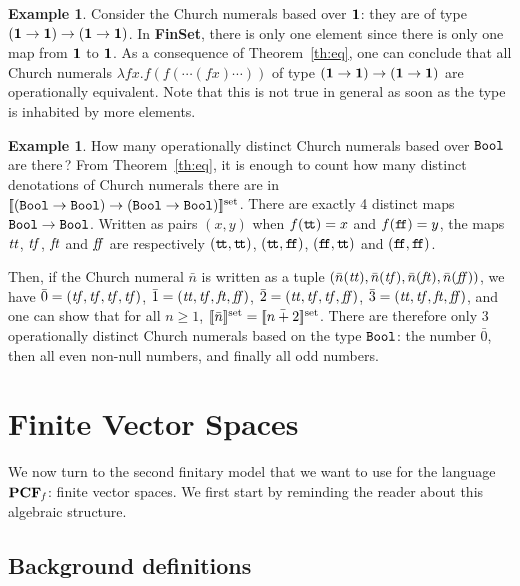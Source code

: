 \documentclass[10pt]{article}
\theoremstyle{plain}
\theoremstyle{definition}
\newtheorem{example}[theorem]{Example}
\newcommand{\FinSet}{\mbox{\bf FinSet}}
\newcommand{\tunit}{{\bf 1}}
\newcommand{\ttrue}{{\tt t}\!{\tt t}}
\newcommand{\ffalse}{{\tt f}\!{\tt f}}
\newcommand{\bit}{{\tt Bool}}
\newcommand{\fsdenot}[1]{{[\![{#1}]\!]^{\rm set}}}
\begin{document}
\begin{example}\label{ex:numunit}
  Consider the Church numerals based over $\tunit$: they are
  of type
  $(\tunit\to\tunit)\to(\tunit\to\tunit)$. 
  In {\FinSet}, there is only one element since there is only one
  map from $\tunit$ to $\tunit$. 
  As a consequence of
  Theorem~\ref{th:eq}, one can conclude that all Church numerals
  $
  \lambda fx.f(f(\cdots (fx)\cdots))$ of type $(\tunit\to\tunit)\to(\tunit\to\tunit)$
  are operationally equivalent. Note that this is not true
  in general as soon as the type is inhabited by more elements.
\end{example}

\begin{example}\label{ex:numbool}
  How many operationally distinct Church numerals based over $\bit$
  are there\,?  From Theorem~\ref{th:eq}, it is enough to count how
  many distinct denotations of Church numerals there are in
  $\fsdenot{(\bit\to\bit)\to(\bit\to\bit)}$. There
  are exactly 4 distinct maps $\bit\to\bit$. Written as pairs $(x,y)$
  when $f(\ttrue)=x$ and $f(\ffalse)=y$, the maps ${\it tt}$, ${\it
    tf}$, ${\it ft}$ and  ${\it ff}$ are respectively
  $(\ttrue,\ttrue)$,
  $(\ttrue,\ffalse)$,
  $(\ffalse,\ttrue)$ and
  $(\ffalse,\ffalse)$.

  Then, if the Church numeral $\bar{n}$ is written as a tuple
  $(\bar{n}({\it tt}),\bar{n}({\it tf}),\bar{n}({\it ft}),\bar{n}({\it
    ff}))$, we have
    $\bar{0} = ({\it tf},{\it tf},{\it tf},{\it tf})$,
    $\bar{1} {}= ({\it tt},{\it tf},{\it ft},{\it ff})$,
    $\bar{2} {}= ({\it tt},{\it tf},{\it tf},{\it ff})$,
    $\bar{3} {}= ({\it tt},{\it tf},{\it ft},{\it ff})$,
  and one can show that for all $n\geq 1$, $\fsdenot{\bar{n}} =
  \fsdenot{\bar{n+2}}$. There are therefore only 3 operationally
  distinct Church numerals based on the type $\bit$: the number
  $\bar{0}$, then all even non-null numbers, and finally all odd
  numbers.
\end{example}




\section{Finite Vector Spaces}
\label{sec:finvec}

We now turn to the second finitary model that we want to use for
the language ${\bf PCF}_{\it f}$: finite vector spaces. We first start by
reminding the reader about this algebraic
structure.

\subsection{Background definitions}
\end{document}
